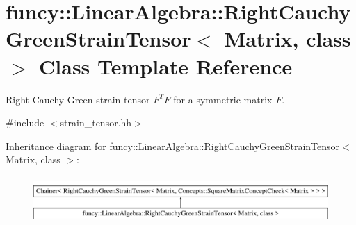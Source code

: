 \hypertarget{classfuncy_1_1LinearAlgebra_1_1RightCauchyGreenStrainTensor}{\section{funcy\-:\-:Linear\-Algebra\-:\-:Right\-Cauchy\-Green\-Strain\-Tensor$<$ Matrix, class $>$ Class Template Reference}
\label{classfuncy_1_1LinearAlgebra_1_1RightCauchyGreenStrainTensor}
}


Right Cauchy-\/\-Green strain tensor $ F^T F $ for a symmetric matrix $ F $.  




{\ttfamily \#include $<$strain\-\_\-tensor.\-hh$>$}

Inheritance diagram for funcy\-:\-:Linear\-Algebra\-:\-:Right\-Cauchy\-Green\-Strain\-Tensor$<$ Matrix, class $>$\-:\begin{figure}[H]
\begin{center}
\leavevmode
\includegraphics[height=1.830065cm]{classfuncy_1_1LinearAlgebra_1_1RightCauchyGreenStrainTensor}
\end{center}
\end{figure}
